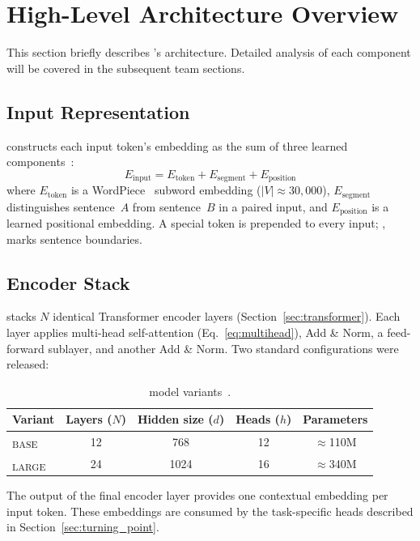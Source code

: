 
\section{High-Level Architecture Overview}
\label{sec:arch}

This section briefly describes \bert{}'s architecture. Detailed analysis of each
component will be covered in the subsequent team sections.

\subsection{Input Representation}

\bert{} constructs each input token's embedding as the sum of three learned
components~\cite{devlin2019bert}:
\begin{equation}
  E_{\text{input}}
    = E_{\text{token}} + E_{\text{segment}} + E_{\text{position}}
  \label{eq:input}
\end{equation}
where $E_{\text{token}}$ is a WordPiece~\cite{wu2016wordpiece} subword embedding
($|V| \approx 30{,}000$), $E_{\text{segment}}$ distinguishes sentence~$A$ from
sentence~$B$ in a paired input, and $E_{\text{position}}$ is a learned
positional embedding. A special \cls{} token is prepended to every input;
\sep{} marks sentence boundaries.

\subsection{Encoder Stack}

\bert{} stacks $N$ identical Transformer encoder layers
(Section~\ref{sec:transformer}). Each layer applies multi-head self-attention
(Eq.~\ref{eq:multihead}), Add \& Norm, a feed-forward sublayer, and another
Add \& Norm. Two standard configurations were released:

\begin{table}[H]
\centering
\caption{\bert{} model variants~\cite{devlin2019bert}.}
\label{tab:bert_variants}
\begin{tabular}{lcccc}
  \toprule
  \textbf{Variant}
    & \textbf{Layers ($N$)}
    & \textbf{Hidden size ($d$)}
    & \textbf{Heads ($h$)}
    & \textbf{Parameters} \\
  \midrule
  \bert{}\textsubscript{BASE}  & 12 & 768  & 12 & $\approx$110M \\
  \bert{}\textsubscript{LARGE} & 24 & 1024 & 16 & $\approx$340M \\
  \bottomrule
\end{tabular}
\end{table}

\noindent
The output of the final encoder layer provides one contextual embedding per
input token. These embeddings are consumed by the task-specific heads described
in Section~\ref{sec:turning_point}.